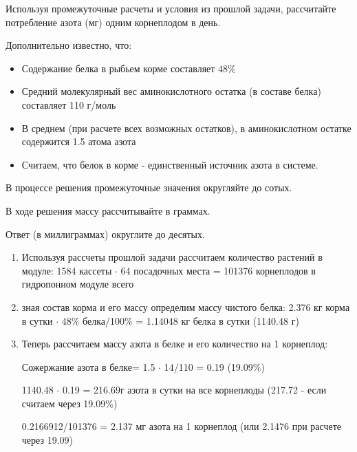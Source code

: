 
Используя промежуточные расчеты и условия из прошлой задачи, рассчитайте потребление азота (мг) одним корнеплодом в день.

Дополнительно известно, что:

\begin{itemize}
    \item Содержание белка в рыбьем корме составляет $48\%$
    \item Средний молекулярный вес аминокислотного остатка (в составе белка) составляет 110 г/моль
    \item В среднем (при расчете всех возможных остатков), в аминокислотном остатке содержится 1.5 атома азота
    \item Считаем, что белок в корме - единственный источник азота в системе.
\end{itemize}

В процессе решения промежуточные значения округляйте до сотых.

В ходе решения массу рассчитывайте в граммах.

Ответ (в миллиграммах) округлите до десятых.

\explanationSection

\begin{enumerate}
    \item Используя рассчеты прошлой задачи рассчитаем количество растений в модуле:
    1584 кассеты $\cdot$ 64 посадочных места = 101376 корнеплодов в гидропонном модуле всего
    \item зная состав корма и его массу определим массу чистого белка: 
    2.376 кг корма в сутки $\cdot$  48\% белка/100\% = 1.14048 кг белка в сутки  (1140.48 г)
    \item Теперь рассчитаем массу азота в белке и его количество на 1 корнеплод:
    
    Сожержание азота в белке= 1.5 $\cdot$ 14/110 = 0.19  (19.09\%)
    
    1140.48 $\cdot$ 0.19 = 216.69г азота в сутки на все корнеплоды (217.72 - если считаем через 19.09\%)
    
    0.2166912/101376 = 2.137 мг азота на 1 корнеплод (или 2.1476 при расчете через 19.09)
\end{enumerate}

